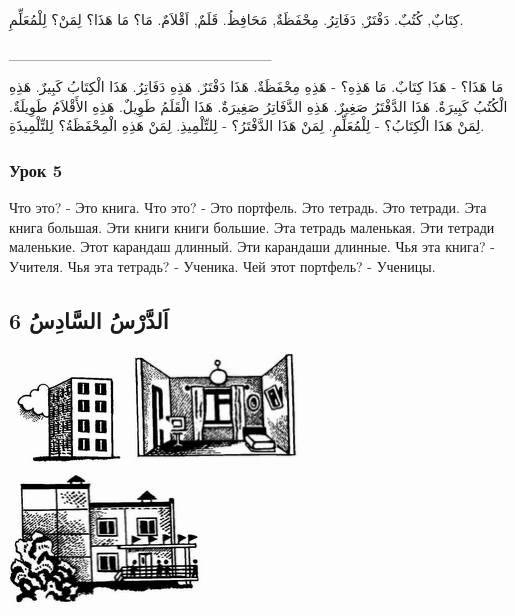 \documentclass[a5paper]{article}
\begin{document}
كِتَابٌ, كُتُبٌ. دَفْتَرٌ, دَفَاتِرُ. مِحْفَظَةٌ, مَحَافِظُ. قَلَمٌ, اَقْلاَمٌ. مَا؟ مَا هَذَا؟ لِمَنْ؟ لِلْمُعَلِّمِ.

\_\_\_\_\_\_\_\_\_\_\_\_\_\_\_\_\_\_\_\_\_\_\_\_\_

مَا هَذَا؟ - هَذَا كِتَابٌ. مَا هَذِهِ؟ - هَذِهِ مِحْفَظَةٌ. هَذَا دَفْتَرٌ. هَذِهِ دَفَاتِرُ. هَذَا الْكِتَابُ كَبِيرٌ. هَذِهِ الْكُتُبُ كَبِيرَةٌ. هَذَا الدَّفْتَرُ صَغِيرٌ. هَذِهِ الدَّفَاتِرُ صَغِيرَةٌ. هَذَا الْقَلَمُ طَوِيلٌ. هَذِهِ الأَقْلاَمُ طَوِيلَةٌ. لِمَنْ هَذَا الْكِتَابُ؟ - لِلْمُعَلِّمِ. لِمَنْ هَذَا الدَّفْتَرُ؟ - لِلتِّلْمِيذِ. لِمَنْ هَذِهِ الْمِحْفَظَةُ؟ لِلتِّلْمِيذَةِ.

\subsubsection{Урок 5}
Что это? - Это книга. Что это? - Это портфель. Это тетрадь. Это тетради. Эта книга большая. Эти книги книги большие. Эта тетрадь маленькая. Эти тетради маленькие. Этот карандаш длинный. Эти карандаши длинные. Чья эта книга? - Учителя. Чья эта тетрадь? - Ученика. Чей этот портфель? - Ученицы. 

\subsection{اَلدَّرْسُ السَّادِسُ 6}
\  \includegraphics[width=1.1354in,height=1.0937in]{MuhammadBagauddinlatinized-img006.jpg}   \includegraphics[width=1.8528in,height=1.1965in]{MuhammadBagauddinlatinized-img007.jpg} \ \  \includegraphics[width=2.0354in,height=1.4374in]{MuhammadBagauddinlatinized-img008.jpg} 
\end{document}
